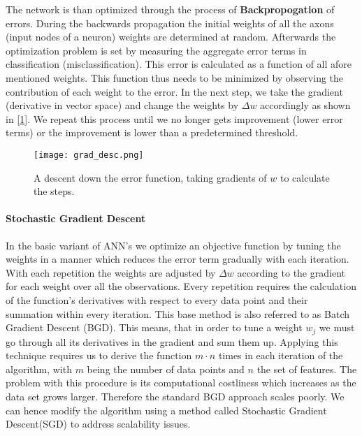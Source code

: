 		\par
		
		The network is than optimized through the process of \textbf{Backpropogation} of errors. During the backwards propagation the initial weights of all the axons (input nodes of a neuron) weights are determined at random. Afterwards the optimization problem is set by measuring the aggregate error terms in classification (misclassification). This error is calculated as a function of all afore mentioned weights. This function thus needs to be minimized by observing the contribution of each weight to the error. In the next step, we take the gradient (derivative in vector space) and change the weights by $ \Delta w $ accordingly as shown in [\ref{ANN_backprop}]. We repeat this process until we no longer gets improvement (lower error terms) or the improvement is lower than a predetermined threshold.
		
		\begin{figure}[h]
			\centering
			\captionsetup{width=0.8\textwidth}
			\texttt{[image: grad\_desc.png]}
			\caption[ANN Gradient Descent]{
				\footnotesize{
					A descent down the error function, taking gradients of $ w $ to calculate the steps.
				}
			} 
			\label{ANN_backprop}
		\end{figure}
	
	\paragraph{Stochastic Gradient Descent}
		In the basic variant of ANN's  we optimize an objective function by tuning the weights in a manner which reduces the error term gradually with each iteration. With each repetition the weights are adjusted by $ \Delta w $ according to the gradient for each weight over all the observations. Every repetition  requires the calculation of the function's derivatives with respect to every data point and their summation within every iteration. This base method is also referred to as Batch Gradient Descent (BGD). This means, that in order to tune a weight $ w_j $ we must go through all its derivatives in the gradient and sum them up.  Applying this technique requires us to derive the function $ m \cdot n $ times in each iteration of the algorithm, with $ m $ being the number of data points and $ n $ the set of features. The problem with this procedure is its computational costliness which increases as the data set grows larger. Therefore the standard BGD approach scales poorly. We can hence modify the algorithm using a method called Stochastic Gradient Descent(SGD) to address scalability issues.
		
